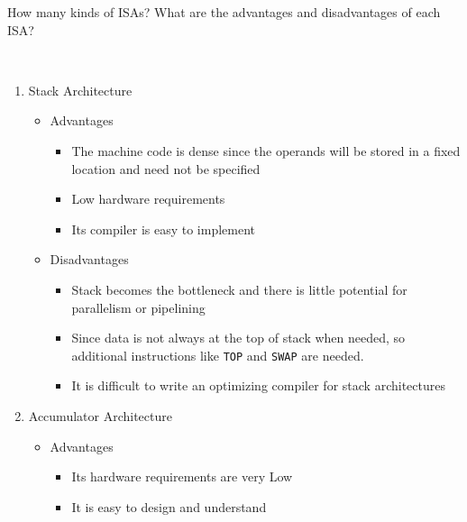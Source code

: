     
\begin{exercise}[]{How many kinds of ISAs? What are the advantages and disadvantages of each ISA?
    }
  \begin{solution}
  \par{~}

\begin{enumerate}
    \item Stack Architecture
        \begin{itemize}
            \item Advantages
            \begin{itemize}
                \item The machine code is dense since the operands will be stored in a fixed location and need not be specified
                \item Low hardware requirements
                \item Its compiler is easy to implement
            \end{itemize}
            \item Disadvantages
            \begin{itemize}
                \item Stack becomes the bottleneck and there is little potential for parallelism or pipelining
                \item Since data is not always at the top of stack when needed, so additional instructions like \texttt{TOP} and \texttt{SWAP} are needed.
                \item It is difficult to write an optimizing compiler for stack architectures
            \end{itemize}
        \end{itemize}



    \item Accumulator Architecture
    \begin{itemize}
        \item Advantages
        \begin{itemize}
            \item Its hardware requirements are very Low
            \item It is easy to design and understand
        \end{itemize}
        

\end{itemize}
\end{enumerate}
\end{solution}
\end{exercise}
